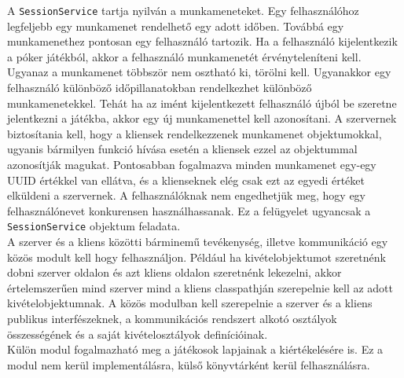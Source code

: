 A \texttt{SessionService} tartja nyilván a munkameneteket. Egy felhasználóhoz legfeljebb egy munkamenet rendelhető egy adott időben. Továbbá egy munkamenethez pontosan egy felhasználó tartozik. Ha a felhasználó kijelentkezik a póker játékból, akkor a felhasználó munkamenetét érvényteleníteni kell. Ugyanaz a munkamenet többször nem osztható ki, törölni kell. Ugyanakkor egy felhasználó különböző időpillanatokban rendelkezhet különböző munkamenetekkel. Tehát ha az imént kijelentkezett felhasználó újból be szeretne jelentkezni a játékba, akkor egy új munkamenettel kell azonosítani. A szervernek biztosítania kell, hogy a kliensek rendelkezzenek munkamenet objektumokkal, ugyanis bármilyen funkció hívása esetén a kliensek ezzel az objektummal azonosítják magukat. Pontosabban fogalmazva minden munkamenet egy-egy UUID értékkel van ellátva, és a klienseknek elég csak ezt az egyedi értéket elküldeni a szervernek. A felhasználóknak nem engedhetjük meg, hogy egy felhasználónevet konkurensen használhassanak. Ez a felügyelet ugyancsak a \texttt{SessionService} objektum feladata. \\
A szerver és a kliens közötti bárminemű tevékenység, illetve kommunikáció egy közös modult kell hogy felhasználjon. Például ha kivételobjektumot szeretnénk dobni szerver oldalon és azt kliens oldalon szeretnénk lekezelni, akkor értelemszerűen mind szerver mind a kliens classpathján szerepelnie kell az adott kivételobjektumnak. A közös modulban kell szerepelnie a szerver és a kliens publikus interfészeknek, a kommunikációs rendszert alkotó osztályok összességének és a saját kivételosztályok definícióinak. \\
Külön modul fogalmazható meg a játékosok lapjainak a kiértékelésére is. Ez a modul nem kerül implementálásra, külső könyvtárként kerül felhasználásra.

